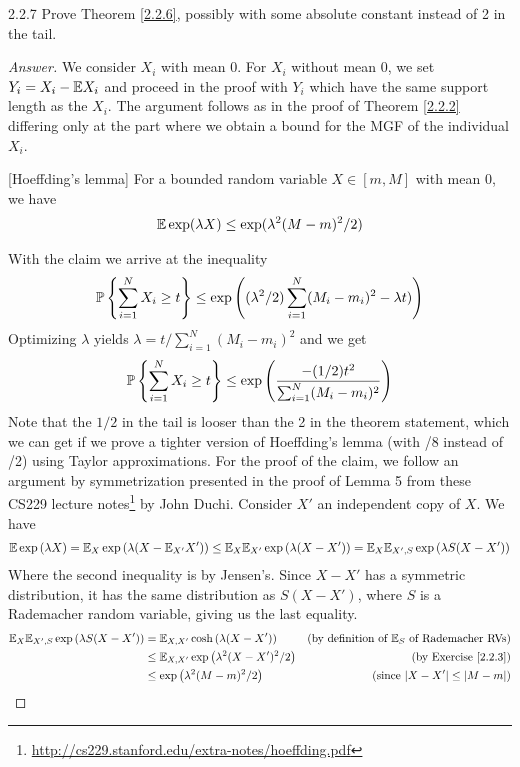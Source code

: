 {\begin{ex}{2.2.7}\label{2.2.7}
Prove Theorem \ref{2.2.6}, possibly with some absolute constant instead of 2 in the tail.
\end{ex}
\begin{proof}[Answer]
We consider $X_i$ with mean 0. For $X_i$ without mean 0, we set $Y_i = X_i - \mathbb{E} X_i$ and proceed in the proof with $Y_i$ which have the same support length as the $X_i$.
The argument follows as in the proof of Theorem \ref{2.2.2} differing only at the part where we obtain a bound for the MGF of the individual $X_i$.

\begin{clm}{}[Hoeffding's lemma]
For a bounded random variable $X \in [m, M]$ with mean 0, we have
\begin{align*}
    \mathbb{E} \exp(\lambda X) \leq \exp (\lambda^2(M-m)^2/2)
\end{align*}
\end{clm}
With the claim we arrive at the inequality
\begin{align*}
    \mathbb{P} \left\{ \sum_{i=1}^N X_i \geq t\right\} \leq \exp\left((\lambda^2/2) \sum_{i=1}^N (M_i -m_i)^2 -\lambda t)\right)
\end{align*}
Optimizing $\lambda$ yields $\lambda = t/\sum_{i=1}^N (M_i - m_i)^2$ and we get
\begin{align*}
\mathbb{P} \left\{ \sum_{i=1}^N X_i \geq t\right\} \leq \exp\left(\frac {-(1/2)t^2}{\sum_{i=1}^N (M_i-m_i)^2}\right)
\end{align*}
Note that the $1/2$ in the tail is looser than the 2 in the theorem statement, which we can get if we prove a tighter version of Hoeffding's lemma (with /8 instead of /2) using Taylor approximations.
For the proof of the claim, we follow an argument by symmetrization presented in the proof of Lemma 5 from these CS229 lecture notes\footnote{\url{http://cs229.stanford.edu/extra-notes/hoeffding.pdf}} by John Duchi.
Consider $X'$ an independent copy of $X$. We have
\begin{align*}
    \mathbb{E} \exp \left(\lambda X\right) = \mathbb{E}_X \exp\left(\lambda (X - \mathbb{E}_{X'} X')\right) \leq \mathbb{E}_X \mathbb{E}_{X'} \exp \left(\lambda (X - X')\right) = \mathbb{E}_X \mathbb{E}_{X',S} \exp \left(\lambda S(X - X')\right) 
\end{align*}
Where the second inequality is by Jensen's. Since $X-X'$ has a symmetric distribution, it has the same distribution as $S (X -X')$, where $S$ is a Rademacher random variable, giving us the last equality.
\begin{align*}
     \mathbb{E}_X \mathbb{E}_{X',S} \exp \left(\lambda S(X - X')\right) &= \mathbb{E}_{X,X'} \cosh \left(\lambda (X - X')\right) &\text{(by definition of $\mathbb{E}_S$ of Rademacher RVs)} \\
     &\leq \mathbb{E}_{X,X'} \exp \left(\lambda^2 (X - X')^2/2\right) &\text{(by Exercise \ref{2.2.3})}\\
     &\leq \exp \left(\lambda^2(M-m)^2/2\right) &\text{(since $|X-X'| \leq |M-m|$)}
\end{align*}
\end{proof}

}
